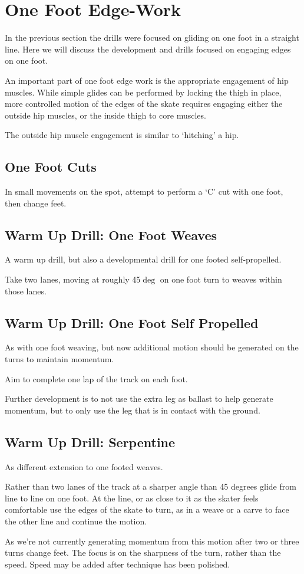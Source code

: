 \section*{One Foot Edge-Work}

In the previous section the drills were focused on gliding on one foot in a straight line.  
Here we will discuss the development and drills focused on engaging edges on one foot. 

An important part of one foot edge work is the appropriate engagement of hip muscles.
While simple glides can be performed by locking the thigh in place, more controlled motion of the edges of the skate requires engaging either the outside hip muscles, or the inside thigh to core muscles.

The outside hip muscle engagement is similar to `hitching' a hip.


\subsection*{One Foot Cuts}

In small movements on the spot, attempt to perform a `C' cut with one foot, then change feet. 



\subsection*{Warm Up Drill: One Foot Weaves} 

A warm up drill, but also a developmental drill for one footed self-propelled.

Take two lanes, moving at roughly 45$\deg$ on one foot turn to weaves within those lanes.    

\subsection*{Warm Up Drill: One Foot Self Propelled} 

As with one foot weaving, but now additional motion should be generated on the turns to maintain momentum.  

Aim to complete one lap of the track on each foot.

Further development is to not use the extra leg as ballast to help generate momentum, but to only use the leg that is in contact with the ground. 

\subsection*{Warm Up Drill: Serpentine} 

As different extension to one footed weaves.

Rather than two lanes of the track at a sharper angle than 45 degrees glide from line to line on one foot. At the line, or as close to it as the skater feels comfortable use the edges of the skate to turn, as in a weave or a carve to face the other line and continue the motion.   

As we're not currently generating momentum from this motion after two or three turns change feet. 
The focus is on the sharpness of the turn, rather than the speed. 
Speed may be added after technique has been polished.
